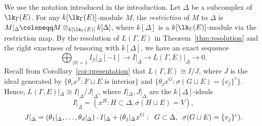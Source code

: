 We use the notation introduced in the introduction. Let $\Delta$ be a subcomplex of $\lk_{\Gamma}(E)$. For any $k[\lk_{\Gamma}(E)]$-module $M$, the \emph{restriction} of $M$ to $\Delta$ is $M|_{\Delta}  \coloneqq  M \otimes_{k[\lk_{\Gamma}(E)]} k[\Delta]$, where $k[\Delta]$ is a $k[\lk_{\Gamma}(E)]$-module via the restriction map. By the resolution of $L(\Gamma,E)$ in  Theorem~\ref{thm:resolution} and the right exactness of tensoring with $k[\Delta]$, we have an exact sequence 
\begin{equation}\label{e:restrict}
 \bigoplus_{|S| = 1} I_{S}|_\Delta[-1] \to I|_\Delta \to L(\Gamma,E)|_\Delta \to 0.
\end{equation}
Recall from Corollary~\ref{cor:presentation} that $L(\Gamma, E) \cong I/J$, where $J$ is the ideal generated by $\{\theta_i x^{F} : F \sqcup E \mbox{ is interior}\}$ and $\{\theta_{j} x^G : \sigma(G \sqcup E) = \{v_j\}^c \}$.  Hence, $L(\Gamma,E)|_\Delta \cong I|_\Delta/J|_\Delta$, where $I|_\Delta,J|_\Delta$ are the $k[\Delta]$-ideals
\begin{equation}\label{eq:Ires}
I|_\Delta = (x^H :  H \subset \Delta, \sigma(H \sqcup E) = V),
\end{equation}
\begin{equation}\label{eq:Jres}
J|_\Delta = (\theta_1|_\Delta,\ldots,\theta_{d}|_\Delta) \cdot I|_\Delta + (\theta_{j}|_{\Delta} x^G: \enskip G \subset \Delta, \enskip \sigma(G \sqcup E) = \{v_j\}^c).    
\end{equation}
